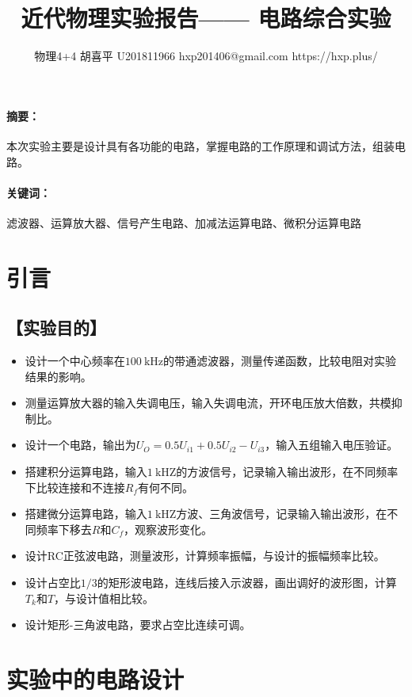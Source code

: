 \documentclass{ctexart}
\date{}
\newcommand{\si}[1]{\  \mathrm{#1}}
\newcommand{\generatetitle}[6]{\title{\zihao{3}\heiti#1} \author{#2 \quad
    \quad #3 \quad\quad #4 \quad\quad #5 \quad\quad #6} \maketitle\thispagestyle{fancy}}
\let\oldsubsection\subsection
\renewcommand{\subsection}[1]{\oldsubsection{\!\!\!\!\!\!【#1】}}
\let\oldparagraph\paragraph
\renewcommand{\paragraph}[1]{\oldparagraph{#1：\!\!\!\!\!\!}}
\begin{document}
\generatetitle{近代物理实验报告——
  电路综合实验}{物理4+4}{胡喜平}{U201811966}{hxp201406@gmail.com}{https://hxp.plus/}

\paragraph{摘要}
本次实验主要是设计具有各功能的电路，掌握电路的工作原理和调试方法，组装电路。

\paragraph{关键词}
滤波器、运算放大器、信号产生电路、加减法运算电路、微积分运算电路

\section{引言}

\subsection{实验目的}

\begin{itemize}
\item 设计一个中心频率在$100 \si{kHz}$的带通滤波器，测量传递函数，比较电阻对实验结果的影响。
\item 测量运算放大器的输入失调电压，输入失调电流，开环电压放大倍数，共模抑制比。
\item 设计一个电路，输出为$U_O = 0.5 U_{i1} + 0.5 U_{i2} - U_{i3}$，输入五组输入电压验证。
\item 搭建积分运算电路，输入$1 \si{kHZ}$的方波信号，记录输入输出波形，在不同频率下比较连接和不连接$R_f$有何不同。
\item 搭建微分运算电路，输入$1 \si{kHZ}$方波、三角波信号，记录输入输出波形，在不同频率下移去$R$和$C_f$，观察波形变化。
\item 设计RC正弦波电路，测量波形，计算频率振幅，与设计的振幅频率比较。
\item 设计占空比$1/3$的矩形波电路，连线后接入示波器，画出调好的波形图，计算$T_k$和$T$，与设计值相比较。
\item 设计矩形-三角波电路，要求占空比连续可调。
\end{itemize}

\section{实验中的电路设计}
\end{document}
